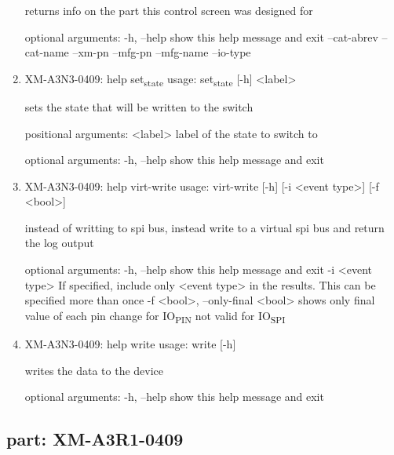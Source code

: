 \documentclass[11pt]{article}
\begin{document}
\begin{enumerate}
returns info on the part this control screen was designed for

optional arguments:
  -h, --help   show this help message and exit
  --cat-abrev
  --cat-name
  --xm-pn
  --mfg-pn
  --mfg-name
  --io-type

\item XM-A3N3-0409: help set\textsubscript{state}
\label{sec:org5544cf5}
usage: set\textsubscript{state} [-h] <label>

sets the state that will be written to the switch

positional arguments:
  <label>     label of the state to switch to

optional arguments:
  -h, --help  show this help message and exit

\item XM-A3N3-0409: help virt-write
\label{sec:orgeb3f898}
usage: virt-write [-h] [-i <event type>] [-f <bool>]

instead of writting to spi bus, instead write to a virtual spi bus and return
the log output

optional arguments:
  -h, --help            show this help message and exit
  -i <event type>       If specified, include only <event type> in the
                        results. This can be specified more than once
  -f <bool>, --only-final <bool>
                        shows only final value of each pin change for IO\textsubscript{PIN}
                        not valid for IO\textsubscript{SPI}

\item XM-A3N3-0409: help write
\label{sec:org1ba8d9d}
usage: write [-h]

writes the data to the device

optional arguments:
  -h, --help  show this help message and exit
\end{enumerate}

\subsection{part: XM-A3R1-0409}
\label{sec:org94dcc4e}
\end{document}
